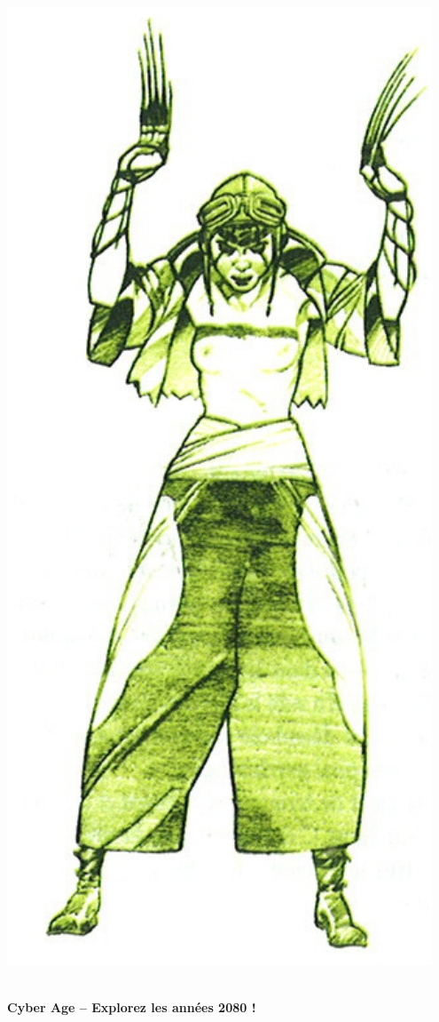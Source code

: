 \documentclass[40pt,twoside,a4paper]{article}
\begin{document}
\begin{minipage}[ht]{0.15\textwidth}
	\includegraphics[width=0.95\textwidth]{../img/personnageIrinaToss.jpg} ~\\~\\
\end{minipage} \hfill \begin{minipage}[ht]{0.65\textwidth}
	\textbf{\LARGE Cyber Age -- Explorez les ann{\'e}es 2080 !} ~\\~\\
	

\end{minipage}
\end{document}
